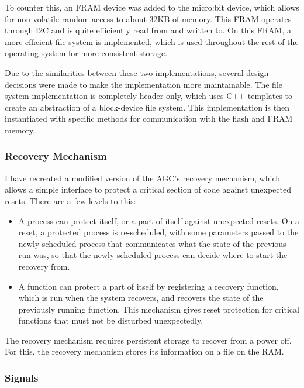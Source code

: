 \documentclass[oxford]{ahsan}
\begin{document}
To counter this, an FRAM device was added to the micro:bit device, which allows for
non-volatile random access to about 32KB of memory. This FRAM operates through I2C and
is quite efficiently read from and written to. On this FRAM, a more efficient file
system is implemented, which is used throughout the rest of the operating system for
more consistent storage.

Due to the similarities between these two implementations, several design decisions
were made to make the implementation more maintainable. The file system implementation
is completely header-only, which uses C++ templates to create an abstraction of a
block-device file system. This implementation is then instantiated with specific
methods for communication with the flash and FRAM memory.


\subsubsection*{Recovery Mechanism}

I have recreated a modified version of the AGC's recovery mechanism, which allows a
simple interface to protect a critical section of code against unexpected resets. There
are a few levels to this:

\begin{itemize}
    \item A process can protect itself, or a part of itself against unexpected resets.
        On a reset, a protected process is re-scheduled, with some parameters passed to
        the newly scheduled process that communicates what the state of the previous
        run was, so that the newly scheduled process can decide where to start the
        recovery from.

    \item A function can protect a part of itself by registering a recovery function,
        which is run when the system recovers, and recovers the state of the previously
        running function. This mechanism gives reset protection for critical functions
        that must not be disturbed unexpectedly. 
\end{itemize}

The recovery mechanism requires persistent storage to recover from a power off. For
this, the recovery mechanism stores its information on a file on the RAM.

\subsubsection*{Signals}
\end{document}
